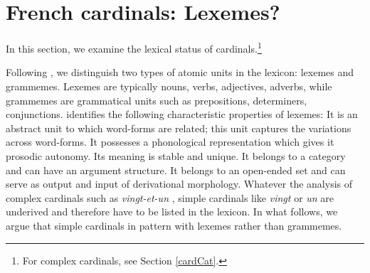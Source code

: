 \documentclass[output=paper]{langsci/langscibook}
\begin{document}

%

\section{French cardinals: Lexemes?}\label{cardLexemes}\label{Sec1}
In this section, we
examine
the lexical status of  cardinals.\footnote{For complex cardinals, see Section \ref{cardCat}.}


Following \cite[102]{Fradin03}, we distinguish two types of atomic units in the lexicon: lexemes and grammemes. Lexemes are typically nouns, verbs, adjectives, adverbs, while grammemes are grammatical units such as prepositions, determiners, conjunctions. \citeauthor{Fradin03} identifies the following characteristic properties of lexemes:
\ea\label{lexCriteria}
	\ea It is an abstract unit to which word-forms are related; this unit captures the variations across word-forms.
	\ex It possesses a phonological representation which gives it prosodic autonomy.
	\ex Its meaning is stable and unique.
	\ex It belongs to a category and can have an argument structure.
	\ex It belongs to an open-ended set and can serve as output and input of derivational morphology.
	\z
\z
Whatever the analysis of  complex cardinals  such as \emph{vingt-et-un} ,
simple cardinals  like \emph{vingt} or \emph{un} are underived and therefore have to be listed in the lexicon. In what follows, we argue that simple cardinals  in  pattern with lexemes rather than grammemes.
\end{document}
